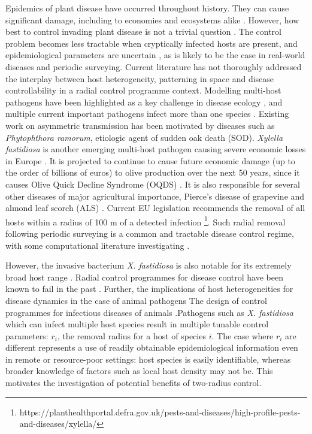 \documentclass[prstpaper]{revtex4-2}
\begin{document}
Epidemics of plant disease have occurred throughout history. They can cause significant damage, including to economies and ecosystems alike \cite{Boyd2013}. However, how best to control invading plant disease is not a trivial question \cite{}. The control problem becomes less tractable when cryptically infected hosts are present, and epidemiological parameters are uncertain \cite{Cunniffe2015}, as is likely to be the case in real-world diseases and periodic surveying.
Current literature has not thoroughly addressed the interplay between host heterogeneity, patterning in space and disease controllability in a radial control programme context. Modelling multi-host pathogens have been highlighted as a key challenge in disease ecology \cite{Buhnerkempe2015}, and multiple current important pathogens infect more than one species \cite{Heesterbeek2007} \cite{}. Existing work on asymmetric transmission has been motivated by diseases such as \emph{Phytophthora ramorum}, etiologic agent of sudden oak death (SOD). \emph{Xylella fastidiosa} is another emerging multi-host pathogen causing severe economic losses in Europe \cite{Bodino2021} \cite{Martelli2016}. It is projected to continue to cause future economic damage (up to the order of billions of euros) to olive production over the next 50 years, since it causes Olive Quick Decline Syndrome (OQDS) \cite{Schneider2020}. It is also responsible for several other diseases of major agricultural importance, Pierce's disease of grapevine and almond leaf scorch (ALS) \cite{GimenezRomero2024}\cite{Gibin2023}. Current EU legislation recommends the removal of all hosts within a radius of 100 m of a detected infection \footnote{https://planthealthportal.defra.gov.uk/pests-and-diseases/high-profile-pests-and-diseases/xylella/}. Such radial removal following periodic surveying is a common and tractable disease control regime, with some computational literature investigating \cite{Cunniffe2015} \cite{HyattTwynam2017} \cite{Jerome2021} \cite{Parnell2009} \cite{Parnell2010}.


However, the invasive bacterium \emph{X. fastidiosa} is also notable for its extremely broad host range \cite{Gibin2023}. Radial control programmes for disease control have been known to fail in the past \cite{}. Further, the implications of host heterogeneities for disease dynamics in the case of animal pathogens 
The design of control programmes for infectious diseases of animals 
.Pathogens such as \emph{X. fastidiosa} which can infect multiple host species \cite{Gibin2023} result in multiple tunable control parameters: $r_{i}$, the removal radius for a host of species $i$. The case where $r_{i}$ are different represents a use of readily obtainable epidemiological information even in remote or resource-poor settings: host species is easily identifiable, whereas broader knowledge of factors such as local host density may not be. This motivates the investigation of potential benefits of two-radius control.
\end{document}
